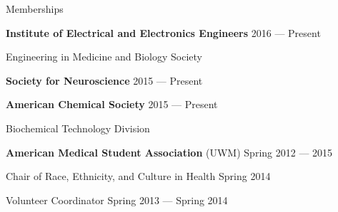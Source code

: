 \documentclass[10pt, oneside]{article}
\begin{document}
\vspace{-8mm}

\vspace{3mm}

\begin{cvlist}{Memberships} %
\vspace{-2mm}
\item \textbf{Institute of Electrical and Electronics Engineers} \hfill{2016 --- Present}
	\item \hspace{9mm} Engineering in Medicine and Biology Society 

	\item \textbf{Society for Neuroscience} \hfill{2015 --- Present}
	\item \hspace{-1.5mm}  \textbf{American Chemical Society} \hfill{2015 --- Present}
	\item \hspace{9mm} Biochemical Technology Division
	\item \textbf{American Medical Student Association}  (UWM) \hfill{Spring 2012 --- 2015} 
	\item \hspace{10mm}Chair of Race, Ethnicity, and Culture in Health \hfill{Spring 2014}  
	\item \hspace{10mm}Volunteer Coordinator \hfill{Spring 2013 --- Spring 2014}
		
	
\end{cvlist}
\vspace{-10mm}
\end{document}

